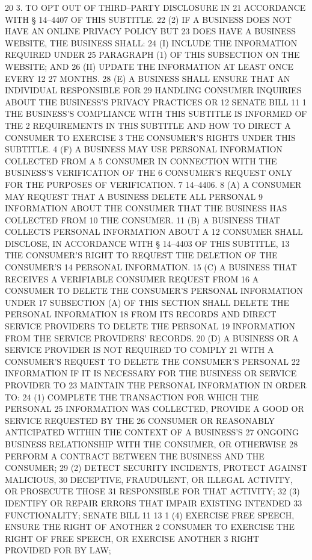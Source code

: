 20 3. TO OPT OUT OF THIRD–PARTY DISCLOSURE IN
21 ACCORDANCE WITH § 14–4407 OF THIS SUBTITLE.
22 (2) IF A BUSINESS DOES NOT HAVE AN ONLINE PRIVACY POLICY BUT
23 DOES HAVE A BUSINESS WEBSITE, THE BUSINESS SHALL:
24 (I) INCLUDE THE INFORMATION REQUIRED UNDER
25 PARAGRAPH (1) OF THIS SUBSECTION ON THE WEBSITE; AND
26 (II) UPDATE THE INFORMATION AT LEAST ONCE EVERY 12
27 MONTHS.
28 (E) A BUSINESS SHALL ENSURE THAT AN INDIVIDUAL RESPONSIBLE FOR
29 HANDLING CONSUMER INQUIRIES ABOUT THE BUSINESS’S PRIVACY PRACTICES OR 
12 SENATE BILL 11
1 THE BUSINESS’S COMPLIANCE WITH THIS SUBTITLE IS INFORMED OF THE
2 REQUIREMENTS IN THIS SUBTITLE AND HOW TO DIRECT A CONSUMER TO EXERCISE
3 THE CONSUMER’S RIGHTS UNDER THIS SUBTITLE.
4 (F) A BUSINESS MAY USE PERSONAL INFORMATION COLLECTED FROM A
5 CONSUMER IN CONNECTION WITH THE BUSINESS’S VERIFICATION OF THE
6 CONSUMER’S REQUEST ONLY FOR THE PURPOSES OF VERIFICATION.
7 14–4406.
8 (A) A CONSUMER MAY REQUEST THAT A BUSINESS DELETE ALL PERSONAL
9 INFORMATION ABOUT THE CONSUMER THAT THE BUSINESS HAS COLLECTED FROM
10 THE CONSUMER.
11 (B) A BUSINESS THAT COLLECTS PERSONAL INFORMATION ABOUT A
12 CONSUMER SHALL DISCLOSE, IN ACCORDANCE WITH § 14–4403 OF THIS SUBTITLE,
13 THE CONSUMER’S RIGHT TO REQUEST THE DELETION OF THE CONSUMER’S
14 PERSONAL INFORMATION.
15 (C) A BUSINESS THAT RECEIVES A VERIFIABLE CONSUMER REQUEST FROM
16 A CONSUMER TO DELETE THE CONSUMER’S PERSONAL INFORMATION UNDER
17 SUBSECTION (A) OF THIS SECTION SHALL DELETE THE PERSONAL INFORMATION
18 FROM ITS RECORDS AND DIRECT SERVICE PROVIDERS TO DELETE THE PERSONAL
19 INFORMATION FROM THE SERVICE PROVIDERS’ RECORDS.
20 (D) A BUSINESS OR A SERVICE PROVIDER IS NOT REQUIRED TO COMPLY
21 WITH A CONSUMER’S REQUEST TO DELETE THE CONSUMER’S PERSONAL
22 INFORMATION IF IT IS NECESSARY FOR THE BUSINESS OR SERVICE PROVIDER TO
23 MAINTAIN THE PERSONAL INFORMATION IN ORDER TO:
24 (1) COMPLETE THE TRANSACTION FOR WHICH THE PERSONAL
25 INFORMATION WAS COLLECTED, PROVIDE A GOOD OR SERVICE REQUESTED BY THE
26 CONSUMER OR REASONABLY ANTICIPATED WITHIN THE CONTEXT OF A BUSINESS’S
27 ONGOING BUSINESS RELATIONSHIP WITH THE CONSUMER, OR OTHERWISE
28 PERFORM A CONTRACT BETWEEN THE BUSINESS AND THE CONSUMER;
29 (2) DETECT SECURITY INCIDENTS, PROTECT AGAINST MALICIOUS,
30 DECEPTIVE, FRAUDULENT, OR ILLEGAL ACTIVITY, OR PROSECUTE THOSE
31 RESPONSIBLE FOR THAT ACTIVITY;
32 (3) IDENTIFY OR REPAIR ERRORS THAT IMPAIR EXISTING INTENDED
33 FUNCTIONALITY;
SENATE BILL 11 13
1 (4) EXERCISE FREE SPEECH, ENSURE THE RIGHT OF ANOTHER
2 CONSUMER TO EXERCISE THE RIGHT OF FREE SPEECH, OR EXERCISE ANOTHER
3 RIGHT PROVIDED FOR BY LAW;
